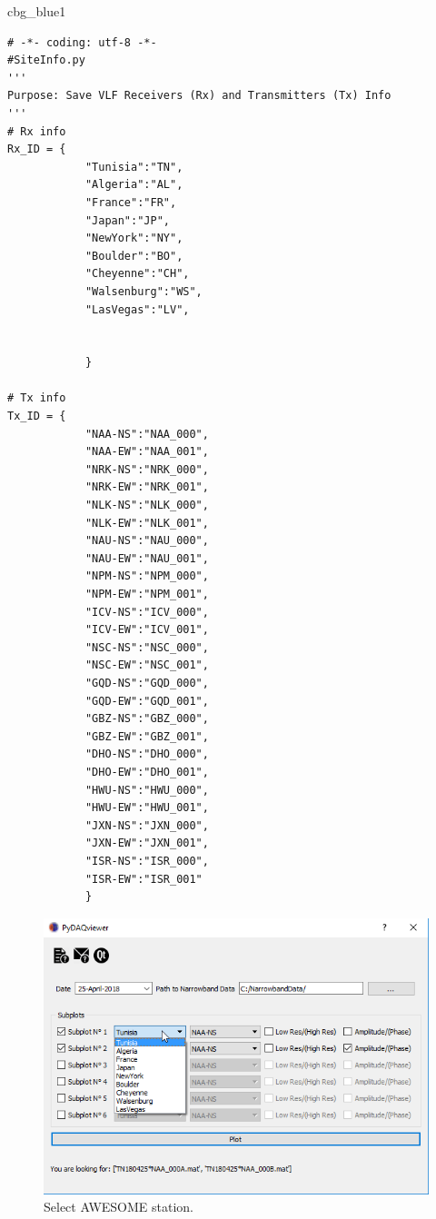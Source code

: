 \documentclass[%
oneside,                 %
final,                   %
10pt]{article}
\newenvironment{cod_vpad}[1]{
   \def\FrameCommand{\colorbox{#1}}
   \MakeFramed{\FrameRestore}}
   {\endMakeFramed}
\begin{document}
\begin{cod_vpad}{cbg_blue1}\begin{verbatim}
# -*- coding: utf-8 -*-
#SiteInfo.py
'''
Purpose: Save VLF Receivers (Rx) and Transmitters (Tx) Info   
'''
# Rx info
Rx_ID = {
            "Tunisia":"TN",
            "Algeria":"AL",
            "France":"FR",
            "Japan":"JP",
            "NewYork":"NY",
            "Boulder":"BO",
            "Cheyenne":"CH",
            "Walsenburg":"WS",
            "LasVegas":"LV",
            
            
            }

# Tx info
Tx_ID = {
            "NAA-NS":"NAA_000", 
            "NAA-EW":"NAA_001",
            "NRK-NS":"NRK_000",
            "NRK-EW":"NRK_001",
            "NLK-NS":"NLK_000",
            "NLK-EW":"NLK_001",
            "NAU-NS":"NAU_000",
            "NAU-EW":"NAU_001",
            "NPM-NS":"NPM_000",
            "NPM-EW":"NPM_001",
            "ICV-NS":"ICV_000",
            "ICV-EW":"ICV_001",
            "NSC-NS":"NSC_000",
            "NSC-EW":"NSC_001",
            "GQD-NS":"GQD_000",
            "GQD-EW":"GQD_001",
            "GBZ-NS":"GBZ_000",
            "GBZ-EW":"GBZ_001",
            "DHO-NS":"DHO_000",
            "DHO-EW":"DHO_001",
            "HWU-NS":"HWU_000",
            "HWU-EW":"HWU_001",
            "JXN-NS":"JXN_000",
            "JXN-EW":"JXN_001",
            "ISR-NS":"ISR_000",
            "ISR-EW":"ISR_001"
            }
\end{verbatim}
\end{cod_vpad}
\noindent



\begin{figure}[!ht]  %
  \centerline{\includegraphics[width=1.0\linewidth]{imgs/SelectRx.png}}
  \caption{
  Select AWESOME station. \label{fig:SelectRx}
  }
\end{figure}
\end{document}
